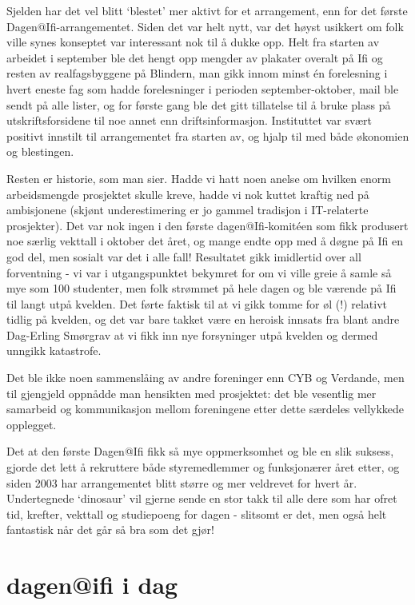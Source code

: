 Sjelden har det vel blitt `blestet' mer aktivt for et arrangement, enn for det første Dagen@Ifi-arrangementet. Siden det var helt nytt, var det høyst usikkert om folk ville synes konseptet var interessant nok til å dukke opp. Helt fra starten av arbeidet i september ble det hengt opp mengder av plakater overalt på Ifi og resten av realfagsbyggene på Blindern, man gikk innom minst én forelesning i hvert eneste fag som hadde forelesninger i perioden september-oktober, mail ble sendt på alle lister, og for første gang ble det gitt tillatelse til å bruke plass på utskriftsforsidene til noe annet enn driftsinformasjon. Instituttet var svært positivt innstilt til arrangementet fra starten av, og hjalp til med både økonomien og blestingen.

Resten er historie, som man sier. Hadde vi hatt noen anelse om hvilken enorm arbeidsmengde prosjektet skulle kreve, hadde vi nok kuttet kraftig ned på ambisjonene (skjønt underestimering er jo gammel tradisjon i IT-relaterte prosjekter). Det var nok ingen i den første dagen@Ifi-komitéen som fikk produsert noe særlig vekttall i oktober det året, og mange endte opp med å døgne på Ifi en god del, men sosialt var det i alle fall! Resultatet gikk imidlertid over all forventning - vi var i utgangspunktet bekymret for om vi ville greie å samle så mye som 100 studenter, men folk strømmet på hele dagen og ble værende på Ifi til langt utpå kvelden. Det førte faktisk til at vi gikk tomme for øl (!) relativt tidlig på kvelden, og det var bare takket være en heroisk innsats fra blant andre Dag-Erling Smørgrav at vi fikk inn nye forsyninger utpå kvelden og dermed unngikk katastrofe.

Det ble ikke noen sammenslåing av andre foreninger enn CYB og Verdande, men til gjengjeld oppnådde man hensikten med prosjektet: det ble vesentlig mer samarbeid og kommunikasjon mellom foreningene etter dette særdeles vellykkede opplegget.

Det at den første Dagen@Ifi fikk så mye oppmerksomhet og ble en slik suksess, gjorde det lett å rekruttere både styremedlemmer og funksjonærer året etter, og siden 2003 har arrangementet blitt større og mer veldrevet for hvert år. Undertegnede `dinosaur' vil gjerne sende en stor takk til alle dere som har ofret tid, krefter, vekttall og studiepoeng for dagen - slitsomt er det, men også helt fantastisk når det går så bra som det gjør!

\section{dagen@ifi i dag}

